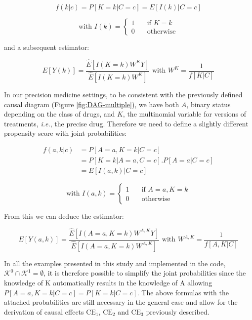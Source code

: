 \documentclass[a4paper,12pt,twoside,onecolumn,openright,final,oldfontcommands]{memoir}
\begin{document}
\[f(k|c)=P[K=k|C=c]=E[I(k)|C=c]\]

\begin{equation*}
\text{with }
I(k) = \left\{
\begin{array}{ll}
1 & \quad \text{if } K = k \\
0 & \quad \text{otherwise}
\end{array}
\right.
\end{equation*}

and a subsequent estimator:

\[E[Y(k)]=\dfrac{\hat{E}[I(K=k)W^{K}Y]}{\hat{E}[I(K=k)W^K]} \text{ with } W^K=\dfrac{1}{f[K|C]}\]

In our precision medicine settings, to be consistent with the previously
defined causal diagram (Figure \ref{fig:DAG-multiple}), we have both
\(A\), binary status depending on the class of drugs, and \(K\), the
multinomial variable for versions of treatments, \emph{i.e.}, the
precise drug. Therefore we need to define a slightly different
propensity score with joint probabilities:

\begin{equation*}
\begin{aligned}
f(a,k|c) & =P[A=a,K=k|C=c]\\
         & =P[K=k|A=a, C=c].P[A=a|C=c]\\
         & =E[I(a,k)|C=c] 
\end{aligned}
\end{equation*}

\begin{equation*}
\text{with }
I(a,k) = \left\{
\begin{array}{ll}
1 & \quad \text{if } A = a, K = k \\
0 & \quad \text{otherwise}
\end{array}
\right.
\end{equation*}

From this we can deduce the estimator:

\[E[Y(a, k)]=\dfrac{\hat{E}[I(A=a,K=k)W^{A,K}Y]}{\hat{E}[I(A=a,K=k)W^{A,K}]} \text{ with } W^{A,K}=\dfrac{1}{f[A,K|C]}\]

In all the examples presented in this study and implemented in the code,
\(\mathcal{K}^{0} \cap \mathcal{K}^{1} = \emptyset\), it is therefore
possible to simplify the joint probabilities since the knowledge of K
automatically results in the knowledge of A allowing
\(P[A=a, K=k|C=c]=P[K=k|C=c]\). The above formulas with the attached
probabilities are still necessary in the general case and allow for the
derivation of causal effects \(\text{CE}_1\), \(\text{CE}_2\) and
\(\text{CE}_3\) previously described.
\end{document}
